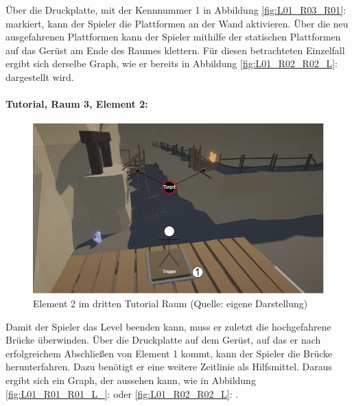 Über die Druckplatte, mit der Kennnummer 1 in Abbildung \ref{fig:L01_R03_R01}:  markiert, kann der Spieler die Plattformen an der Wand aktivieren. Über die neu ausgefahrenen Plattformen kann der Spieler mithilfe der statischen Plattformen auf das Gerüst am Ende des Raumes klettern. Für diesen betrachteten Einzelfall ergibt sich derselbe Graph, wie er bereits in Abbildung \ref{fig:L01_R02_R02_L}:  dargestellt wird.

\paragraph{Tutorial, Raum 3, Element 2:}
\medskip

\begin{figure}[ht]
\centering
\includegraphics[width=0.8\linewidth]{content/pictures/Raetsel-L01_R03_R02.jpg}
\caption{Element 2 im dritten Tutorial Raum (Quelle: eigene Darstellung)}
\label{fig:L01_R03_R02}
\end{figure}

Damit der Spieler das Level beenden kann, muss er zuletzt die hochgefahrene Brücke überwinden. Über die Druckplatte auf dem Gerüst, auf das er nach erfolgreichem Abschließen von Element 1 kommt, kann der Spieler die Brücke herunterfahren. Dazu benötigt er eine weitere Zeitlinie als Hilfsmittel. Daraus ergibt sich ein Graph, der aussehen kann, wie in Abbildung \ref{fig:L01_R01_R01_L_}:  oder \ref{fig:L01_R02_R02_L}: .

